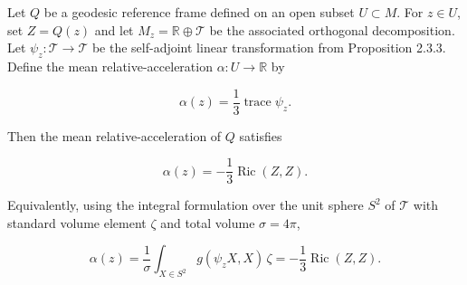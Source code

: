 Let $Q$ be a geodesic reference frame defined on an open subset $U \subset M$. For $z \in U$, set $Z = Q(z)$ and let $M_z = \mathbb{R} \oplus \mathcal{T}$ be the associated orthogonal decomposition. Let $\psi_z : \mathcal{T} \to \mathcal{T}$ be the self-adjoint linear transformation from Proposition 2.3.3. Define the mean relative-acceleration $\alpha : U \to \mathbb{R}$ by

$$\alpha(z) = \frac{1}{3} \operatorname{trace} \psi_z.$$

Then the mean relative-acceleration of $Q$ satisfies

$$\alpha(z) = -\frac{1}{3} \operatorname{Ric}(Z, Z).$$

Equivalently, using the integral formulation over the unit sphere $S^2$ of $\mathcal{T}$ with standard volume element $\zeta$ and total volume $\sigma = 4\pi$,

$$\alpha(z) = \frac{1}{\sigma} \int_{X \in S^2} g(\psi_z X, X) \, \zeta = -\frac{1}{3} \operatorname{Ric}(Z, Z).$$
